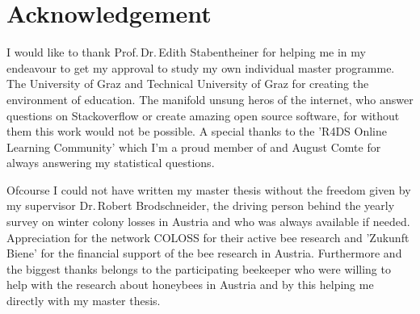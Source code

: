 \chapter*{Acknowledgement}
\label{sec:acknowledgement}
\vspace*{-10mm}

I would like to thank Prof.\,Dr.\,Edith Stabentheiner for helping me in my endeavour to get my approval to study my own individual master programme. The University of Graz and Technical University of Graz for creating the environment of education. The manifold unsung heros of the internet, who answer questions on Stackoverflow or create amazing open source software, for without them this work would not be possible. A special thanks to the 'R4DS Online Learning Community' which I'm a proud member of and August Comte for always answering my statistical questions.

Ofcourse I could not have written my master thesis without the freedom given by my supervisor Dr.\,Robert Brodschneider, the driving person behind the yearly survey on winter colony losses in Austria and who was always available if needed. Appreciation for the network COLOSS for their active bee research and 'Zukunft Biene' for the financial support of the bee research in Austria. Furthermore and the biggest thanks belongs to the participating beekeeper who were willing to help with the research about honeybees in Austria and by this helping me directly with my master thesis.